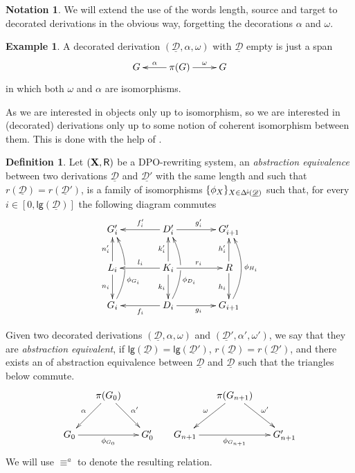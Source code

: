 \documentclass[a4paper]{article}
\newcommand{\Deltamin}{\Delta^{\hspace{-1pt}\downarrow\hspace{-1pt}}}
\def\R{\mathsf{R}}
\def\X{\textbf {\textup{X}}}
\newcommand{\dder}[1]{\mathscr{#1}}
\newcommand{\der}[1]{\underline{\dder{#1}}}
\newcommand{\lgh}[0]{\mathsf{lg}}
\theoremstyle{definition}
\newtheorem{definition}[theorem]{Definition}
\newtheorem*{notation}{Notation}
\newtheorem{example}[theorem]{Example}
\begin{document}
\begin{notation}
	We will extend the use of the words length, source and target to decorated derivations in the obvious way, forgetting the decorations $\alpha$ and $\omega$.
\end{notation}

\begin{example}A decorated derivation $(\der{D}, \alpha, \omega)$ with $\der{D}$ empty is just a span
	\[\xymatrix{G & \pi(G) \ar[r]^-{\omega} \ar[l]_-{\alpha} & G}\]
	in which both $\omega$ and $\alpha$ are isomorphisms.
\end{example}

As we are interested in objects only up to isomorphism, so we are interested in (decorated) derivations only up to some notion of coherent isomorphism between them. This is done with the help of .

\begin{definition}Let $(\X, \R)$ be a DPO-rewriting system,  an \emph{abstraction equivalence} between two derivations $\der{D}$ and $\der{D'}$ with the same length and such that $r(\der{D})=r(\der{D}')$, is a family of isomorphisms $\{\phi_X\}_{X\in \Deltamin(\der{D})}$ such that, for every $i\in [0, \lgh(\der{D})]$ the following diagram commutes
	\[\xymatrix@C=40pt{G'_i&D'_i \ar[r]^{g'_i} \ar[l]_{f'_i}&G'_{i+1}\\  L_i \ar[u]^{n'_i} \ar[d]_{n_i}& K_i \ar[u]^{k'_i} \ar[d]_{k_i} \ar[r]^{r_i} \ar[l]_{l_i} &R\ar[u]^{h'_i} \ar[d]_{h_i}\\G_i \ar@/_.45cm/[uu]_(.35){\phi_{G_i}}|\hole&D_i\ar[l]^{f_i}\ar@/_.45cm/[uu]_(.35){\phi_{D_i}}|\hole \ar[r]_{g_i}&G_{i+1}\ar@/_.45cm/[uu]_{\phi_{H_i}}}\]

Given two decorated derivations $(\der{D}, \alpha, \omega)$ and $(\der{D}', \alpha', \omega')$, we say that they are \emph{abstraction equivalent}, if $\lgh(\der{D})=\lgh(\der{D}')$, $r(\der{D})=r(\der{D'})$, and there exists an of abstraction equivalence between $\der{D}$ and  $\der{D}$ such that the triangles below commute.
\[\xymatrix@C=15pt{&\pi(G_0) \ar[dr]^{\alpha'} \ar[dl]_{\alpha}&&& \pi(G_{n+1}) \ar[dr]^{\omega'} \ar[dl]_{\omega}\\ G_0 \ar[rr]_{\phi_{G_0}} && G'_0 &G_{n+1} \ar[rr]_{\phi_{G_{n+1}}} && G'_{n+1} } \]
We will use $\equiv^a$ to denote the resulting relation.
\end{definition}
\end{document}

